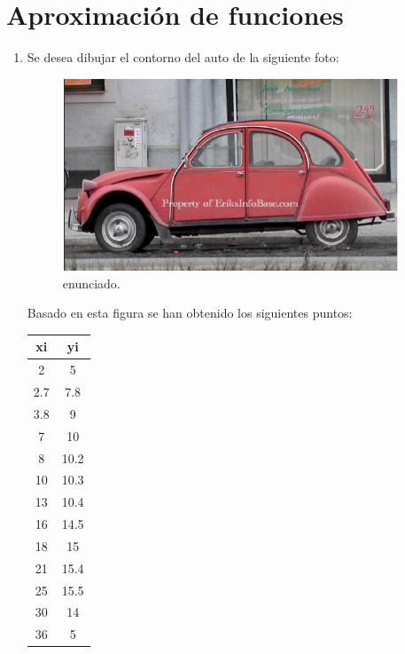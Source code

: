 \documentclass{udpreport}
\begin{document}
\chapter{Aproximación de funciones} 
\begin{enumerate}
    
\vspace{0.9cm}
\item 

Se desea dibujar el contorno del auto de la siguiente foto:

\begin{figure}[H]
    \centering
    \includegraphics[width=10cm]{enun1}
    \caption{enunciado.} \label{fig:enun1}
\end{figure}


Basado en esta figura se han obtenido los siguientes puntos:



\begin{table}[H]
    \centering
        \begin{tabular} { |c|c|}
        
        \hline
        xi  &  yi\\
        \hline
        2 &  5       \\
         \hline
        2.7 &  7.8        \\
         \hline
        3.8 &  9        \\
         \hline
        7 &  10        \\
         \hline
        8 &  10.2        \\
         \hline
        10 & 10.3        \\
         \hline
        13 & 10.4          \\
         \hline
        16 &  14.5        \\
         \hline
        18 &  15       \\
         \hline
        21 &  15.4        \\
         \hline
        25 &  15.5       \\
         \hline
        30 &  14       \\
        \hline
        36& 5
        

\end{tabular}
\end{table}
\end{enumerate}
\end{document}
